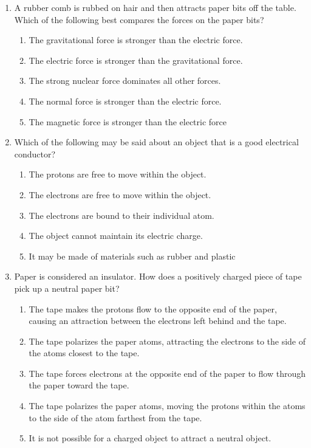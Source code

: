 \documentclass{../../../oss-classkick}
\begin{document}
\begin{multicols*}{2}
\begin{enumerate}[leftmargin=18pt]
  \item A rubber comb is rubbed on hair and then attracts paper bits off the
    table. Which of the following best compares the forces on the paper bits?
    \begin{enumerate}[nosep,leftmargin=18pt,label=(\Alph*)]
    \item The gravitational force is stronger than the electric force.
    \item The electric force is stronger than the gravitational force.
    \item The strong nuclear force dominates all other forces.
    \item The normal force is stronger than the electric force.
    \item The magnetic force is stronger than the electric force
    \end{enumerate}
    \vspace{.7in}
    
  \item Which of the following may be said about an object that is a good
    electrical conductor?
    \begin{enumerate}[nosep,leftmargin=18pt,label=(\Alph*)]
    \item The protons are free to move within the object.
    \item The electrons are free to move within the object.
    \item The electrons are bound to their individual atom.
    \item The object cannot maintain its electric charge.
    \item It may be made of materials such as rubber and plastic
    \end{enumerate}
    \vspace{.7in}
    
  \item Paper is considered an insulator. How does a positively charged piece
    of tape pick up a neutral paper bit?
     \begin{enumerate}[nosep,leftmargin=18pt,label=(\Alph*)]
     \item The tape makes the protons flow to the opposite end of the paper,
       causing an attraction between the electrons left behind and the tape.
     \item The tape polarizes the paper atoms, attracting the electrons to the
       side of the atoms closest to the tape.
     \item The tape forces electrons at the opposite end of the paper to flow
       through the paper toward the tape.
     \item The tape polarizes the paper atoms, moving the protons within the
       atoms to the side of the atom farthest from the tape.
     \item It is not possible for a charged object to attract a neutral object.
     \end{enumerate}
     \vspace{.7in}
     \columnbreak
     

\end{enumerate}
\end{multicols*}
\end{document}
